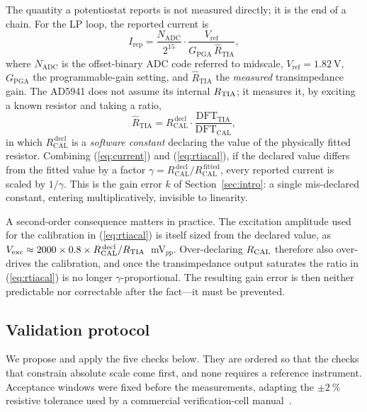 The quantity a potentiostat reports is not measured directly; it is the end of a
chain. For the LP loop, the reported current is
\begin{equation}
I_{\mathrm{rep}}
  = \frac{N_{\mathrm{ADC}}}{2^{15}}\cdot\frac{V_{\mathrm{ref}}}{G_{\mathrm{PGA}}\,\hat{R}_{\mathrm{TIA}}},
\label{eq:current}
\end{equation}
where $N_{\mathrm{ADC}}$ is the offset-binary ADC code referred to midscale,
$V_{\mathrm{ref}} = \SI{1.82}{\volt}$, $G_{\mathrm{PGA}}$ the programmable-gain
setting, and $\hat{R}_{\mathrm{TIA}}$ the \emph{measured} transimpedance gain.
The AD5941 does not assume its internal $R_{\mathrm{TIA}}$; it measures it, by exciting a
known resistor and taking a ratio,
\begin{equation}
\hat{R}_{\mathrm{TIA}}
  = R_{\mathrm{CAL}}^{\,\mathrm{decl}}\cdot
    \frac{\mathrm{DFT}_{\mathrm{TIA}}}{\mathrm{DFT}_{\mathrm{CAL}}},
\label{eq:rtiacal}
\end{equation}
in which $R_{\mathrm{CAL}}^{\,\mathrm{decl}}$ is a \emph{software constant}
declaring the value of the physically fitted resistor. Combining
(\ref{eq:current}) and (\ref{eq:rtiacal}), if the declared value differs from the
fitted value by a factor $\gamma = R_{\mathrm{CAL}}^{\,\mathrm{decl}} /
R_{\mathrm{CAL}}^{\,\mathrm{fitted}}$, every reported current is scaled by
$1/\gamma$. This is the gain error $k$ of Section~\ref{sec:intro}: a single
mis-declared constant, entering multiplicatively, invisible to linearity.

A second-order consequence matters in practice. The excitation amplitude used
for the calibration in (\ref{eq:rtiacal}) is itself sized from the declared
value, as $V_{\mathrm{exc}} \approx 2000\times0.8\times
R_{\mathrm{CAL}}^{\,\mathrm{decl}}/R_{\mathrm{TIA}}$~mV$_{pp}$. Over-declaring $R_{\mathrm{CAL}}$
therefore also over-drives the calibration, and once the transimpedance output
saturates the ratio in (\ref{eq:rtiacal}) is no longer $\gamma$-proportional.
The resulting gain error is then neither predictable nor correctable after the
fact---it must be prevented.

\subsection{Validation protocol}
\label{sec:protocol}

We propose and apply the five checks below. They are ordered so that the checks
that constrain absolute scale come first, and none requires a reference
instrument. Acceptance windows were fixed before the measurements, adapting the
$\pm\SI{2}{\percent}$ resistive tolerance used by a commercial verification-cell
manual~\cite{gamry2011universal}.

